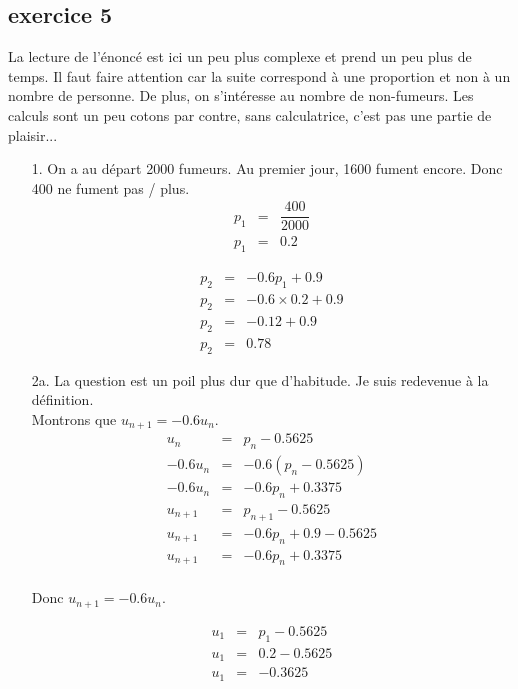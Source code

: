 \documentclass[11pt]{article}
\begin{document}
\begin{multicols}{2}
  \section{exercice 5} 

  La lecture de l'énoncé est ici un peu plus complexe et prend un peu plus de temps. Il faut faire attention car la suite correspond à une proportion et non à un nombre de personne. De plus, on s'intéresse au nombre de non-fumeurs. Les calculs sont un peu cotons par contre, sans calculatrice, c'est pas une partie de plaisir...
  
  \begin{enumerate}
  \item[1.] On a au départ 2000 fumeurs. Au premier jour, 1600 fument encore. Donc 400 ne fument pas / plus. 
    \begin{eqnarray*}
      p_1 &=& \dfrac{400}{2000} \\
      p_1 &=& 0.2
    \end{eqnarray*}
    
    \begin{eqnarray*}
      p_2 &=& -0.6 p_1 + 0.9 \\
      p_2 &=& -0.6 \times 0.2 + 0.9 \\
      p_2 &=& -0.12 + 0.9 \\
      p_2 &=& 0.78
    \end{eqnarray*}

  \item[2a.] La question est un poil plus dur que d'habitude. Je suis redevenue à la définition.\\
    Montrons que $u_{n+1} = -0.6 u_n$.
    \begin{eqnarray*}
      u_n &=& p_n - 0.5625 \\
      -0.6 u_n &=& -0.6(p_n - 0.5625) \\
      -0.6 u_n &=& -0.6p_n + 0.3375 \\
      u_{n+1} &=& p_{n+1} - 0.5625 \\
      u_{n+1} &=& -0.6 p_n + 0.9 - 0.5625 \\
      u_{n+1} &=& -0.6 p_n + 0.3375 \\
    \end{eqnarray*}
    
    Donc $u_{n+1} = -0.6 u_n$.
    
    \begin{eqnarray*}
      u_1 &=& p_1 - 0.5625 \\
      u_1 &=& 0.2 - 0.5625 \\
      u_1 &=& - 0.3625 \\
    \end{eqnarray*}
    

\end{enumerate}
\end{multicols}
\end{document}
